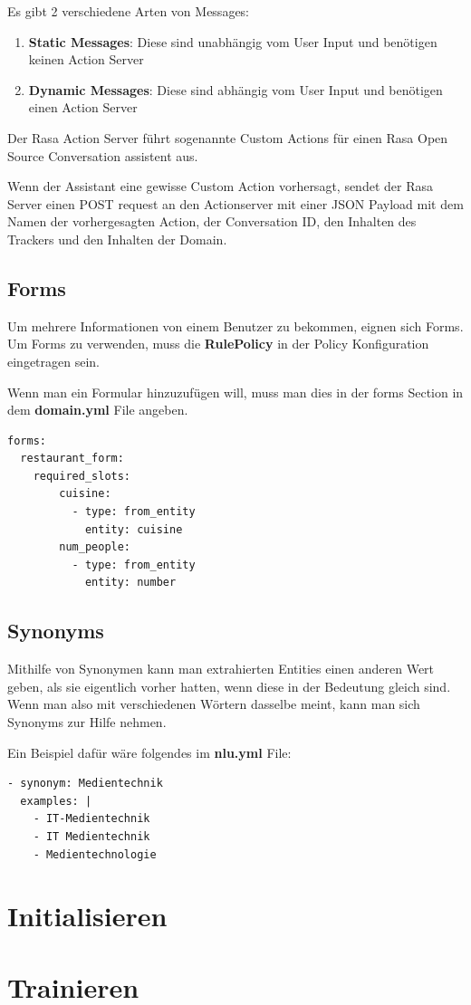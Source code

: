 Es gibt 2 verschiedene Arten von Messages:

\begin{enumerate}
  \item \textbf{Static Messages}: Diese sind unabhängig vom User Input und benötigen keinen Action Server\cite{actionsVid}
  \item \textbf{Dynamic Messages}: Diese sind abhängig vom User Input und benötigen einen Action Server\cite{actionsVid}
\end{enumerate}

Der Rasa Action Server führt sogenannte Custom Actions für einen Rasa Open Source Conversation assistent aus.

Wenn der Assistant eine gewisse Custom Action vorhersagt, sendet der Rasa Server einen POST request an den Actionserver mit einer JSON Payload mit dem Namen der vorhergesagten Action, der Conversation ID, den Inhalten des Trackers und den Inhalten der Domain.\cite{actions}

\subsection{Forms}

Um mehrere Informationen von einem Benutzer zu bekommen, eignen sich Forms.
Um Forms zu verwenden, muss die \textbf{RulePolicy} in der Policy Konfiguration eingetragen sein.\cite{forms}

Wenn man ein Formular hinzuzufügen will, muss man dies in der forms Section in dem \textbf{domain.yml} File angeben.

\begin{lstlisting}[label={lst: Forms Example}]
forms:
  restaurant_form:
    required_slots:
        cuisine:
          - type: from_entity
            entity: cuisine
        num_people:
          - type: from_entity
            entity: number
\end{lstlisting}


\subsection{Synonyms}

Mithilfe von Synonymen kann man extrahierten Entities einen anderen Wert geben, als sie eigentlich vorher hatten, wenn diese in der Bedeutung gleich sind.
Wenn man also mit verschiedenen Wörtern dasselbe meint, kann man sich Synonyms zur Hilfe nehmen.\cite{synonyms}

Ein Beispiel dafür wäre folgendes im \textbf{nlu.yml} File:

\begin{lstlisting}[label={lst: Synonym Example}]
- synonym: Medientechnik
  examples: |
    - IT-Medientechnik
    - IT Medientechnik
    - Medientechnologie
\end{lstlisting}

\section{Initialisieren}


\section{Trainieren}
